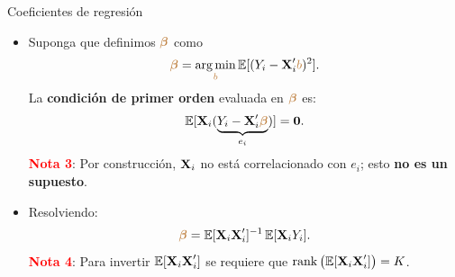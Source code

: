 \documentclass[9pt, xcolor=dvipsnames]{beamer}
\begin{document}
\begin{frame}{Coeficientes de regresión}
    \begin{itemize}
        \item Suponga que definimos \(\textcolor{brown}{\boldsymbol{\beta}}\) como
        \begin{align}\label{EQ:REG-COEF-POP}
            \textcolor{brown}{\betaB} = \argmin_{\textcolor{brown}{b}} \EX[(Y_i - \XB'_i\textcolor{brown}{b})^2].
        \end{align}
        La \textbf{condición de primer orden} evaluada en \(\textcolor{brown}{\boldsymbol{\beta}}\) es:
        \begin{align*}
            \operatorname{\mathbb{E}}[\textbf{X}_i (\underbrace{Y_i - \textbf{X}'_i \textcolor{brown}{\boldsymbol{\beta}}}_{e_i})] = \textbf{0}.
        \end{align*}
        \textcolor{red}{\textbf{Nota 3}}: Por construcción, \(\textbf{X}_i\) no está correlacionado con \(e_i\); esto \textbf{no es un supuesto}.
        \vspace{0.5em}
        \item Resolviendo:
        \vspace{-1.0em}
        \begin{align*}
            \textcolor{brown}{\boldsymbol{\beta}} = \operatorname{\mathbb{E}}[\textbf{X}_i\textbf{X}'_i]^{-1} \operatorname{\mathbb{E}}[\textbf{X}_iY_i].
        \end{align*}
    \textcolor{red}{\textbf{Nota 4}}: Para invertir \(\operatorname{\mathbb{E}}[\textbf{X}_i\textbf{X}'_i]\) se requiere que \(\mathrm{rank}\left(\operatorname{\mathbb{E}}[\textbf{X}_i\textbf{X}'_i]\right) = K\).
    \end{itemize}
\end{frame}
\end{document}
